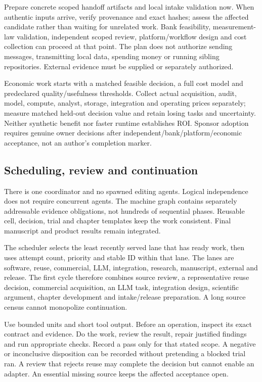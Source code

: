 \documentclass[
  10pt,
]{article}
\begin{document}
Prepare concrete scoped handoff artifacts and local intake validation
now. When authentic inputs arrive, verify provenance and exact hashes;
assess the affected candidate rather than waiting for unrelated work.
Bank feasibility, measurement-law validation, independent scoped review,
platform/workflow design and cost collection can proceed at that point.
The plan does not authorize sending messages, transmitting local data,
spending money or running sibling repositories. External evidence must
be supplied or separately authorized.

Economic work starts with a matched feasible decision, a full cost model
and predeclared quality/usefulness thresholds. Collect actual
acquisition, audit, model, compute, analyst, storage, integration and
operating prices separately; measure matched held-out decision value and
retain losing tasks and uncertainty. Neither synthetic benefit nor
faster runtime establishes ROI. Sponsor adoption requires genuine owner
decisions after independent/bank/platform/economic acceptance, not an
author's completion marker.

\hypertarget{scheduling-review-and-continuation}{%
\subsection{Scheduling, review and
continuation}\label{scheduling-review-and-continuation}}

There is one coordinator and no spawned editing agents. Logical
independence does not require concurrent agents. The machine graph
contains separately addressable evidence obligations, not hundreds of
sequential phases. Reusable cell, decision, trial and chapter templates
keep the work consistent. Final manuscript and product results remain
integrated.

The scheduler selects the least recently served lane that has ready
work, then uses attempt count, priority and stable ID within that lane.
The lanes are software, reuse, commercial, LLM, integration, research,
manuscript, external and release. The first cycle therefore combines
source review, a representative reuse decision, commercial acquisition,
an LLM task, integration design, scientific argument, chapter
development and intake/release preparation. A long source census cannot
monopolize continuation.

Use bounded units and short tool output. Before an operation, inspect
its exact contract and evidence. Do the work, review the result, repair
justified findings and run appropriate checks. Record a pass only for
that stated scope. A negative or inconclusive disposition can be
recorded without pretending a blocked trial ran. A review that rejects
reuse may complete the decision but cannot enable an adapter. An
essential missing source keeps the affected acceptance open.
\end{document}
